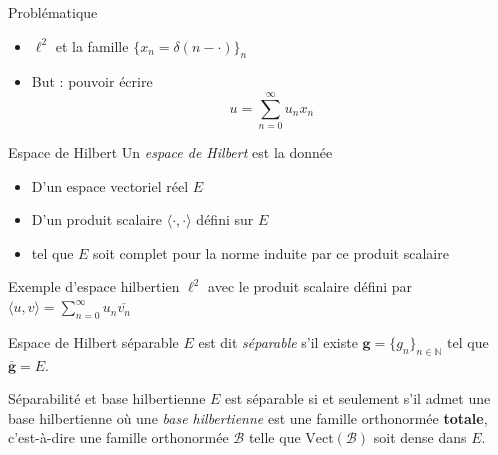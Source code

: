 \documentclass[french]{beamer}
\begin{document}
\begin{frame}{Problématique}
	\begin{itemize}
		\item<1-> $\ell^2$ et la famille $\{x_n = \delta(n - \cdot)\}_n$
		\item<2-> But : pouvoir écrire $$u = \sum_{n = 0}^{\infty} u_n x_n$$
	\end{itemize}
\end{frame}

\begin{frame}{Espace de Hilbert}
	Un \textit{espace de Hilbert} est la donnée
	\pause
	\begin{itemize}
		\item D'un espace vectoriel réel $E$ \pause
		\item D'un produit scalaire $\langle \cdot, \cdot \rangle$ défini sur $E$ \pause
		\item tel que $E$ soit complet pour la norme induite par ce produit scalaire
	\end{itemize}
\end{frame}

\begin{frame}{Exemple d'espace hilbertien}
	$\ell^2$ avec le produit scalaire défini par $\displaystyle \langle u, v \rangle = \sum_{n = 0}^{\infty} u_n \overline{v_n}$
\end{frame}

\begin{frame}{Espace de Hilbert séparable}
	$E$ est dit \textit{séparable} s'il existe $\mathbf{g} = \{g_n\}_{n \in \mathbb{N}}$ tel que $\overline{\mathbf{g}} = E$.
\end{frame}

\begin{frame}{Séparabilité et base hilbertienne}
	$E$ est séparable si et seulement s'il admet une base hilbertienne
	\pause
	où une \textit{base hilbertienne} est une famille orthonormée \textbf{totale}, c'est-à-dire une famille orthonormée $\mathcal{B}$ telle que $\text{Vect}(\mathcal{B})$ soit dense dans $E$.
\end{frame}
\end{document}
